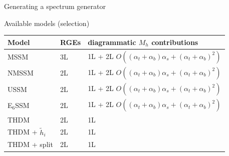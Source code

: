 \documentclass[hyperref={pdfpagelabels=false},ngerman]{beamer}
\newcommand{\Lagr}{\mathcal{L}}
\renewcommand{\emph}{\textbf}
\begin{document}
\begin{frame}{Generating a spectrum generator}
  \begin{figure}
    \centering
  \end{figure}
\end{frame}


\begin{frame}{Available models (selection)}
  \begin{table}
    \centering
    \begin{tabular}{llll}
      Model             & RGEs & \multicolumn{2}{l}{diagrammatic $M_h$ contributions} \\
      \midrule
      MSSM              & 3L   & \multicolumn{2}{l}{1L + 2L $O((\alpha_t + \alpha_b) \alpha_s + (\alpha_t + \alpha_b)^2)$} \\
      NMSSM             & 2L   & \multicolumn{2}{l}{1L + 2L $O((\alpha_t + \alpha_b) \alpha_s + (\alpha_t + \alpha_b)^2)$} \\
      USSM              & 2L   & \multicolumn{2}{l}{1L + 2L $O((\alpha_t + \alpha_b) \alpha_s + (\alpha_t + \alpha_b)^2)$} \\
      E$_6$SSM          & 2L   & \multicolumn{2}{l}{1L + 2L $O((\alpha_t + \alpha_b) \alpha_s + (\alpha_t + \alpha_b)^2)$} \\
      THDM              & 2L   & 1L \\
      THDM + $\tilde{h}_i$ & 2L   & 1L \\
      THDM + split      & 2L   & 1L \\
    \end{tabular}
  \end{table}
\end{frame}
\end{document}
